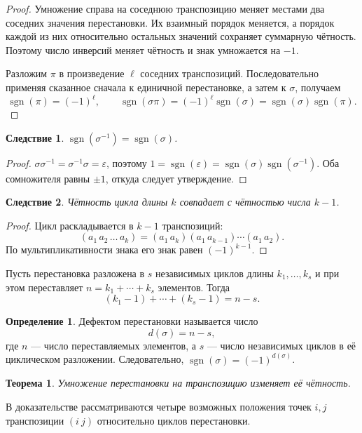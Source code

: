 \documentclass[12pt,a4paper,oneside,openany]{book}
\theoremstyle{definition}
\newtheorem{definition}{Определение}[chapter]
\theoremstyle{plain}
\newtheorem{theorem}{Теорема}[chapter]
\newtheorem{corollary}{Следствие}[chapter]
\theoremstyle{remark}
\DeclareMathOperator{\sgn}{sgn}
\newcommand{\eps}{\varepsilon}
\begin{document}
\begin{proof}
Умножение справа на соседнюю транспозицию меняет местами два соседних
значения перестановки. Их взаимный порядок меняется, а порядок каждой
из них относительно остальных значений сохраняет суммарную чётность.
Поэтому число инверсий меняет чётность и знак умножается на $-1$.

Разложим $\pi$ в произведение $\ell$ соседних транспозиций. Последовательно
применяя сказанное сначала к единичной перестановке, а затем к $\sigma$,
получаем
\[
  \sgn(\pi)=(-1)^\ell,\qquad
  \sgn(\sigma\pi)=(-1)^\ell\sgn(\sigma)
  =\sgn(\sigma)\sgn(\pi).
\]
\end{proof}

\begin{corollary}
$\sgn(\sigma^{-1})=\sgn(\sigma)$.
\end{corollary}

\begin{proof}
$\sigma\sigma^{-1}=\sigma^{-1}\sigma=\eps$, поэтому
$1=\sgn(\eps)=\sgn(\sigma)\sgn(\sigma^{-1})$. Оба сомножителя равны
$\pm1$, откуда следует утверждение.
\end{proof}

\begin{corollary}
Чётность цикла длины $k$ совпадает с чётностью числа $k-1$.
\end{corollary}

\begin{proof}
Цикл раскладывается в $k-1$ транспозиций:
\[
  (a_1\,a_2\,\ldots\,a_k)
  =(a_1\,a_k)(a_1\,a_{k-1})\cdots(a_1\,a_2).
\]
По мультипликативности знака его знак равен $(-1)^{k-1}$.
\end{proof}

Пусть перестановка разложена в $s$ независимых циклов длины
$k_1,\ldots,k_s$ и при этом переставляет $n=k_1+\cdots+k_s$ элементов.
Тогда
\[
  (k_1-1)+\cdots+(k_s-1)=n-s.
\]

\begin{definition}
Дефектом перестановки называется число
\[
  d(\sigma)=n-s,
\]
где $n$ --- число переставляемых элементов, а $s$ --- число независимых
циклов в её циклическом разложении. Следовательно,
$\sgn(\sigma)=(-1)^{d(\sigma)}$.
\end{definition}

\begin{theorem}
Умножение перестановки на транспозицию изменяет её чётность.
\end{theorem}

В доказательстве рассматриваются четыре возможных положения точек $i,j$
транспозиции $(i\ j)$ относительно циклов перестановки.
\end{document}
